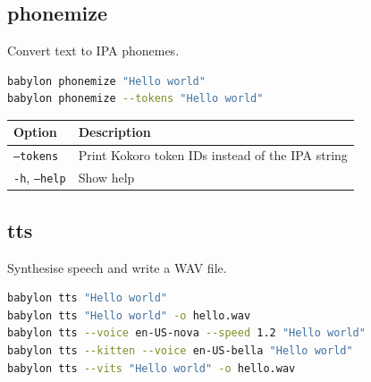\documentclass[12pt,a4paper]{article}
\begin{document}
\subsection{phonemize}

Convert text to IPA phonemes.

\begin{lstlisting}[language=bash]
babylon phonemize "Hello world"
babylon phonemize --tokens "Hello world"
\end{lstlisting}

\begin{center}
\begin{tabular}{ll}
\toprule
\textbf{Option} & \textbf{Description} \\
\midrule
\texttt{--tokens} & Print Kokoro token IDs instead of the IPA string \\
\texttt{-h}, \texttt{--help} & Show help \\
\bottomrule
\end{tabular}
\end{center}

\subsection{tts}

Synthesise speech and write a WAV file.

\begin{lstlisting}[language=bash]
babylon tts "Hello world"
babylon tts "Hello world" -o hello.wav
babylon tts --voice en-US-nova --speed 1.2 "Hello world"
babylon tts --kitten --voice en-US-bella "Hello world"
babylon tts --vits "Hello world" -o hello.wav
\end{lstlisting}
\end{document}
